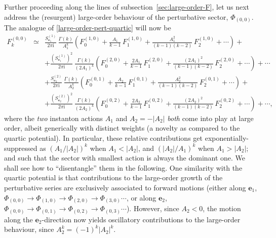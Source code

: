 \documentclass[11pt,a4paper]{article}
\begin{document}
Further proceeding along the lines of subsection~\ref{sec:large-order-F}, let us next address the (resurgent) large-order behaviour of the perturbative sector, $\Phi_{(0,0)}$. The analogue of \eqref{large-order-pert-quartic} will now be
%
\begin{eqnarray}
\label{eq:00-nonres}
F_k^{(0,0)} &\simeq& \frac{S^{(1)}_{\boldsymbol{e}_1}}{2\pi\mathrm{i}}\, \frac{\Gamma(k)}{A_1^k} \left( F^{(1,0)}_0 + \frac{A_1}{k-1}\, F^{(1,0)}_1 + \frac{A_1^2}{(k-1)(k-2)}\, F^{(1,0)}_2 + \cdots \right) + \\
&& + \frac{\left( S^{(1)}_{\boldsymbol{e}_1} \right)^2}{2\pi\mathrm{i}}\, \frac{\Gamma(k)}{\left( 2A_1 \right)^k} \left( F^{(2,0)}_0 + \frac{2A_1}{k-1}\, F^{(2,0)}_1 + \frac{\left( 2A_1 \right)^2}{(k-1)(k-2)}\, F^{(2,0)}_2 + \cdots \right) + \cdots \nonumber \\
&& + \frac{S^{(2)}_{\boldsymbol{e}_2}}{2\pi\mathrm{i}}\, \frac{\Gamma(k)}{A_2^k} \left( F^{(0,1)}_0 + \frac{A_2}{k-1}\, F^{(0,1)}_1 + \frac{A_2^2}{(k-1)(k-2)}\, F^{(0,1)}_2 + \cdots \right) + \nonumber \\
&& + \frac{\left( S^{(2)}_{\boldsymbol{e}_2} \right)^2}{2\pi\mathrm{i}}\, \frac{\Gamma(k)}{\left( 2A_2 \right)^k} \left( F^{(0,2)}_0 + \frac{2A_2}{k-1}\, F^{(0,2)}_1 + \frac{\left( 2A_2 \right)^2}{(k-1)(k-2)}\, F^{(0,2)}_2 + \cdots \right) + \cdots, \nonumber
\end{eqnarray} 
%
\noindent
where the \textit{two} instanton actions $A_1$ and $A_2=-|A_2|$ \textit{both} come into play at large order, albeit generically with distinct weights (a novelty as compared to the quartic potential). In particular, these relative contributions get exponentially-suppressed as $(A_1/|A_2|)^k$ when $A_1<|A_2|$, and $(|A_2|/A_1)^k$ when $A_1>|A_2|$; and such that the sector with smallest action is always the dominant one. We shall see how to ``disentangle'' them in the following. One similarity with the quartic potential is that contributions to the large-order growth of the perturbative series are exclusively associated to forward motions (either along $\boldsymbol{e}_1$, $\Phi_{(0,0)} \rightarrow \Phi_{(1,0)} \rightarrow \Phi_{(2,0)} \rightarrow \Phi_{(3,0)} \cdots$, or along $\boldsymbol{e}_2$, $\Phi_{(0,0)} \rightarrow \Phi_{(0,1)} \rightarrow \Phi_{(0,2)} \rightarrow \Phi_{(0,3)} \cdots$). However, since $A_2<0$, the motion along the $\boldsymbol{e}_2$-direction now yields oscillatory contributions to the large-order behaviour, since $A_2^k = (-1)^k |A_2|^k$. 
\end{document}
